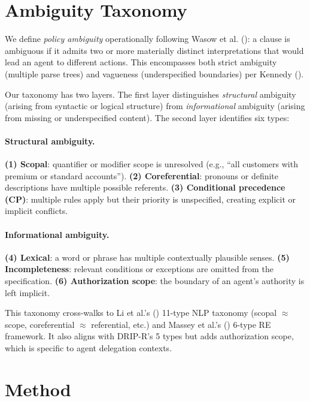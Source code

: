 \documentclass[11pt,a4paper]{article}
\begin{document}
\section{Ambiguity Taxonomy}
\label{sec:taxonomy}

We define \emph{policy ambiguity} operationally following Wasow et al. (\citeyear{wasow2005intuitions}): a clause is ambiguous if it admits two or more materially distinct interpretations that would lead an agent to different actions. This encompasses both strict ambiguity (multiple parse trees) and vagueness (underspecified boundaries) per Kennedy (\citeyear{kennedy2007vagueness}).

Our taxonomy has two layers. The first layer distinguishes \emph{structural} ambiguity (arising from syntactic or logical structure) from \emph{informational} ambiguity (arising from missing or underspecified content). The second layer identifies six types:

\paragraph{Structural ambiguity.}
\textbf{(1) Scopal}: quantifier or modifier scope is unresolved (e.g., ``all customers with premium or standard accounts''). \textbf{(2) Coreferential}: pronouns or definite descriptions have multiple possible referents. \textbf{(3) Conditional precedence (CP)}: multiple rules apply but their priority is unspecified, creating explicit or implicit conflicts.

\paragraph{Informational ambiguity.}
\textbf{(4) Lexical}: a word or phrase has multiple contextually plausible senses. \textbf{(5) Incompleteness}: relevant conditions or exceptions are omitted from the specification. \textbf{(6) Authorization scope}: the boundary of an agent's authority is left implicit.

This taxonomy cross-walks to Li et al.'s (\citeyear{li2024ambiguity}) 11-type NLP taxonomy (scopal $\approx$ scope, coreferential $\approx$ referential, etc.) and Massey et al.'s (\citeyear{massey2014evaluating}) 6-type RE framework. It also aligns with DRIP-R's 5 types but adds authorization scope, which is specific to agent delegation contexts.


\section{Method}
\label{sec:method}
\end{document}
